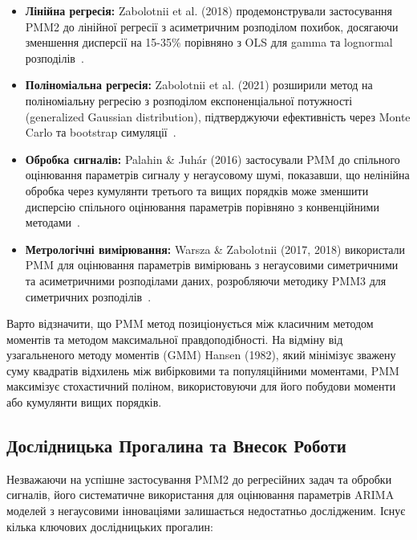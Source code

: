 \documentclass[12pt,a4paper]{article}
\begin{document}
\begin{itemize}
    \item \textbf{Лінійна регресія:} Zabolotnii et al. (2018) продемонстрували застосування PMM2 до лінійної регресії з асиметричним розподілом похибок, досягаючи зменшення дисперсії на 15-35\% порівняно з OLS для gamma та lognormal розподілів~\cite{zabolotnii2018polynomial}.

    \item \textbf{Поліноміальна регресія:} Zabolotnii et al. (2021) розширили метод на поліноміальну регресію з розподілом експоненціальної потужності (generalized Gaussian distribution), підтверджуючи ефективність через Monte Carlo та bootstrap симуляції~\cite{zabolotnii2021estimating}.

    \item \textbf{Обробка сигналів:} Palahin \& Juhár (2016) застосували PMM до спільного оцінювання параметрів сигналу у негаусовому шумі, показавши, що нелінійна обробка через кумулянти третього та вищих порядків може зменшити дисперсію спільного оцінювання параметрів порівняно з конвенційними методами~\cite{palahin2016joint}.

    \item \textbf{Метрологічні вимірювання:} Warsza \& Zabolotnii (2017, 2018) використали PMM для оцінювання параметрів вимірювань з негаусовими симетричними та асиметричними розподілами даних, розробляючи методику PMM3 для симетричних розподілів~\cite{warsza2017polynomial,zabolotnii2020estimation}.
\end{itemize}

Варто відзначити, що PMM метод позиціонується між класичним методом моментів та методом максимальної правдоподібності. На відміну від узагальненого методу моментів (GMM) Hansen (1982), який мінімізує зважену суму квадратів відхилень між вибірковими та популяційними моментами, PMM максимізує стохастичний поліном, використовуючи для його побудови моменти або кумулянти вищих порядків.

\subsection{Дослідницька Прогалина та Внесок Роботи}
\label{subsec:research_gap}

Незважаючи на успішне застосування PMM2 до регресійних задач та обробки сигналів, його систематичне використання для оцінювання параметрів ARIMA моделей з негаусовими інноваціями залишається недостатньо дослідженим. Існує кілька ключових дослідницьких прогалин:
\end{document}
